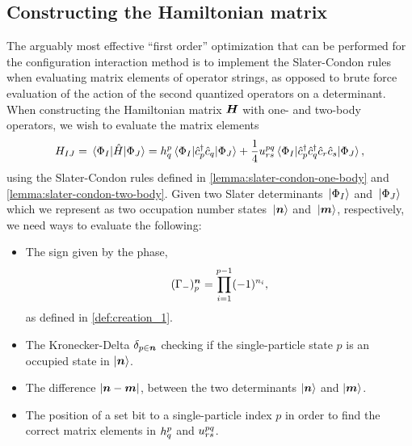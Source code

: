         \subsection{Constructing the Hamiltonian matrix}
            The arguably most effective ``first order'' optimization that can be
            performed for the configuration interaction method is to implement
            the Slater-Condon rules when evaluating matrix elements of operator
            strings, as opposed to brute force evaluation of the action of the
            second quantized operators on a determinant.
            When constructing the Hamiltonian matrix $\boldsymbol{H}$ with one- and
            two-body operators, we wish to evaluate the matrix elements
            \begin{align}
                H_{IJ}
                = \mel*{\Phi_{I}}{\hat{H}}{\Phi_J}
                =
                h^{p}_{q}
                \mel*{\Phi_{I}}{\hat{c}_{p}^{\dagger}\hat{c}_{q}}{\Phi_J}
                +
                \frac{1}{4}
                u^{pq}_{rs}
                \mel*{\Phi_{I}}{
                    \hat{c}_{p}^{\dagger}
                    \hat{c}_{q}^{\dagger}
                    \hat{c}_{r}
                    \hat{c}_{s}
                }{\Phi_J},
            \end{align}
            using the Slater-Condon rules defined in
            \autoref{lemma:slater-condon-one-body} and
            \autoref{lemma:slater-condon-two-body}.
            Given two Slater determinants $\ket*{\Phi_I}$ and $\ket*{\Phi_J}$
            which we represent as two occupation number states $\ket*{\boldsymbol{n}}$
            and $\ket*{\boldsymbol{m}}$, respectively, we need ways to evaluate the
            following:
            \begin{itemize}
                \item The sign given by the phase,
                    \begin{align}
                        (\Gamma_{-})^{\boldsymbol{n}}_{p}
                        = \prod_{i = 1}^{p - 1}(-1)^{n_i},
                    \end{align}
                    as defined in \autoref{def:creation_1}.
                \item The Kronecker-Delta $\delta_{p \in \boldsymbol{n}}$ checking if
                    the single-particle state $p$ is an occupied state in
                    $\ket{\boldsymbol{n}}$.
                \item The difference $\abs{\boldsymbol{n} - \boldsymbol{m}}$, between the two
                    determinants $\ket{\boldsymbol{n}}$ and $\ket{\boldsymbol{m}}$.
                \item The position of a set bit to a single-particle index $p$
                    in order to find the correct matrix elements in
                    $h^{p}_{q}$ and $u^{pq}_{rs}$.
            \end{itemize}
